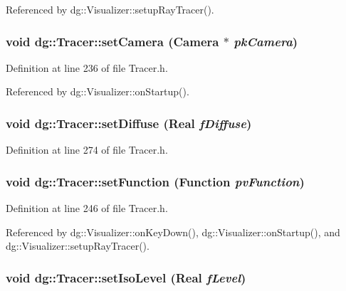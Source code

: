 Referenced by dg::Visualizer::setup\-Ray\-Tracer().
\subsubsection{\setlength{\rightskip}{0pt plus 5cm}void dg::Tracer::set\-Camera ({\bf Camera} $\ast$ {\em pk\-Camera})\hspace{0.3cm}{\tt  [inline]}}\label{classdg_1_1Tracer_a2}




Definition at line 236 of file Tracer.h.

Referenced by dg::Visualizer::on\-Startup().
\subsubsection{\setlength{\rightskip}{0pt plus 5cm}void dg::Tracer::set\-Diffuse ({\bf Real} {\em f\-Diffuse})\hspace{0.3cm}{\tt  [inline]}}\label{classdg_1_1Tracer_a25}




Definition at line 274 of file Tracer.h.
\subsubsection{\setlength{\rightskip}{0pt plus 5cm}void dg::Tracer::set\-Function ({\bf Function} {\em pv\-Function})\hspace{0.3cm}{\tt  [inline]}}\label{classdg_1_1Tracer_a4}




Definition at line 246 of file Tracer.h.

Referenced by dg::Visualizer::on\-Key\-Down(), dg::Visualizer::on\-Startup(), and dg::Visualizer::setup\-Ray\-Tracer().
\subsubsection{\setlength{\rightskip}{0pt plus 5cm}void dg::Tracer::set\-Iso\-Level ({\bf Real} {\em f\-Level})\hspace{0.3cm}{\tt  [inline]}}\label{classdg_1_1Tracer_a13}




